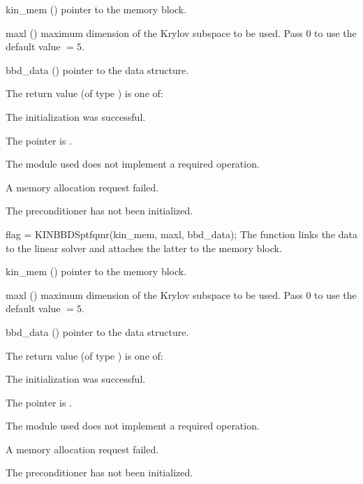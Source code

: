 {
  \begin{args}
  \item[kin\_mem] ()
    pointer to the {\kinsol} memory block.
  \item[maxl] ()
    maximum dimension of the Krylov subspace to be used. Pass $0$ to use the 
    default value $=5$.
  \item[bbd\_data] ()
    pointer to the {\kinbbdpre} data structure.
  \end{args}
}
{
  The return value  (of type ) is one of:
  \begin{args}
  \item[\Id{KINSPILS\_SUCCESS}] 
    The {\kinspgmr} initialization was successful.
  \item[\Id{KINSPILS\_MEM\_NULL}]
    The  pointer is .
  \item[\Id{KINSPILS\_ILL\_INPUT}]
    The {\nvector} module used does not implement a required operation.
  \item[\Id{KINSPILS\_MEM\_FAIL}]
    A memory allocation request failed.
  \item[\Id{KINBBDPRE\_PDATA\_NULL}]
    The {\kinbbdpre} preconditioner has not been initialized.
  \end{args}
}
{}
{
  flag = KINBBDSptfqmr(kin\_mem, maxl, bbd\_data);
}
{
  The function  links the {\kinbbdpre} data to the
  {\kinsptfqmr} linear solver and attaches the latter to the {\kinsol}
  memory block.
}
{
  \begin{args}
  \item[kin\_mem] ()
    pointer to the {\kinsol} memory block.
  \item[maxl] ()
    maximum dimension of the Krylov subspace to be used. Pass $0$ to use the 
    default value $=5$.
  \item[bbd\_data] ()
    pointer to the {\kinbbdpre} data structure.
  \end{args}
}
{
  The return value  (of type ) is one of:
  \begin{args}
  \item[\Id{KINSPILS\_SUCCESS}] 
    The {\kinspgmr} initialization was successful.
  \item[\Id{KINSPILS\_MEM\_NULL}]
    The  pointer is .
  \item[\Id{KINSPILS\_ILL\_INPUT}]
    The {\nvector} module used does not implement a required operation.
  \item[\Id{KINSPILS\_MEM\_FAIL}]
    A memory allocation request failed.
  \item[\Id{KINBBDPRE\_PDATA\_NULL}]
    The {\kinbbdpre} preconditioner has not been initialized.
  \end{args}
}
